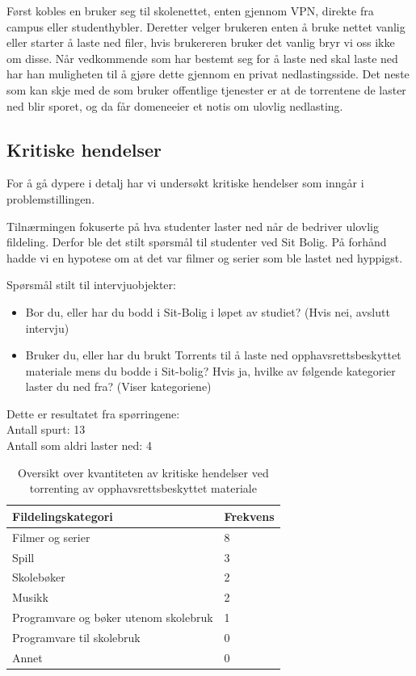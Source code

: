 Først kobles en bruker seg til skolenettet, enten gjennom VPN, direkte fra campus eller studenthybler. Deretter velger brukeren enten å bruke nettet vanlig eller starter å laste ned filer, hvis brukereren bruker det vanlig bryr vi oss ikke om disse. Når vedkommende som har bestemt seg for å laste ned skal laste ned har han muligheten til å gjøre dette gjennom en privat nedlastingsside. Det neste som kan skje med de som bruker offentlige tjenester er at de torrentene de laster ned blir sporet, og da får domeneeier et notis om ulovlig nedlasting.

\subsection{Kritiske hendelser}
For å gå dypere i detalj har vi undersøkt kritiske hendelser som inngår i problemstillingen. 

Tilnærmingen fokuserte på hva studenter laster ned når de bedriver ulovlig fildeling. Derfor ble det stilt spørsmål til studenter ved Sit Bolig. På forhånd hadde vi en hypotese om at det var filmer og serier som ble lastet ned hyppigst.

Spørsmål stilt til intervjuobjekter:
\begin{itemize}
    \item Bor du, eller har du bodd i Sit-Bolig i løpet av studiet? (Hvis nei, avslutt intervju)
    \item Bruker du, eller har du brukt Torrents til å laste ned opphavsrettsbeskyttet materiale mens du bodde i Sit-bolig? Hvis ja, hvilke av følgende kategorier laster du ned fra? (Viser kategoriene)
\end{itemize}

\noindent Dette er resultatet fra spørringene: \\
\indent Antall spurt: 13 \\
\indent Antall som aldri laster ned: 4
\begin{table} [H]
    \caption[Frekvensen av ulike kategorier av nedlasting]{Oversikt over kvantiteten av kritiske hendelser ved torrenting av opphavsrettsbeskyttet materiale}
    \begin{tabular}{ | m{18em} | m{18em} | }
        \hline
            \cellcolor{yellow} Fildelingskategori & \cellcolor{yellow} Frekvens \\
        \hline
            Filmer og serier & 8  \\
        \hline
            Spill & 3 \\
        \hline
            Skolebøker & 2 \\
        \hline
            Musikk & 2 \\
        \hline
            Programvare og bøker utenom skolebruk & 1 \\
        \hline
            Programvare til skolebruk & 0 \\
        \hline
            Annet & 0 \\
        \hline
    \end{tabular}
    \label{kritisk_tabell_1}
\end{table}

